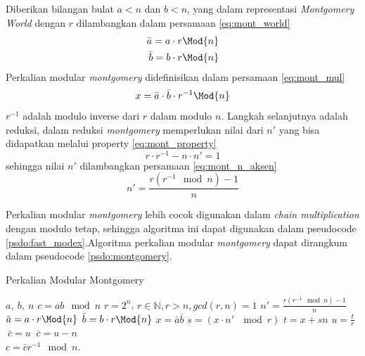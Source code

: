 Diberikan bilangan bulat $ a < n $ dan $ b < n $, yang dalam representasi \textit{Montgomery World} dengan $ r $ dilambangkan dalam persamaan \eqref{eq:mont_world}
\begin{equation}
	\begin{aligned}
		\bar{a} = a \cdot r \Mod{n} \\
		\bar{b} = b \cdot r \Mod{n} \\
	\end{aligned}
	\label{eq:mont_world}
\end{equation}
Perkalian modular \textit{montgomery} didefinisikan dalam persamaan \eqref{eq:mont_mul}
\begin{equation}
	x = \bar{a} \cdot \bar{b} \cdot r^{-1} \Mod{n}
	\label{eq:mont_mul}
\end{equation}
$ r^{-1} $ adalah modulo inverse dari $ r $ dalam modulo $ n $. Langkah selanjutnya adalah reduksi, dalam reduksi \textit{montgomery} memperlukan nilai dari $ n' $ yang bisa didapatkan melalui property \eqref{eq:mont_property}
\begin{equation}
	r \cdot r^{-1} - n \cdot n' = 1
	\label{eq:mont_property}
\end{equation}
sehingga nilai $ n' $ dilambangkan persamaan \eqref{eq:mont_n_aksen}
\begin{equation}
	n' = \frac{r(r^{-1}\mod{n}) -1}{n}
	\label{eq:mont_n_aksen}
\end{equation}

Perkalian modular \textit{montgomery} lebih cocok digunakan dalam \textit{chain multiplication} dengan modulo tetap, sehingga algoritma ini dapat digunakan dalam pseudocode \ref{psdo:fast_modex}.Algoritma perkalian modular \textit{montgomery} dapat dirangkum dalam pseudocode \ref{psdo:montgomery}. 

\begin{algorithm}
	\caption{Perkalian Modular Montgomery}
	\label{psdo:montgomery}
	\begin{algorithmic}[1]
		\Require $a,\ b,\ n$
		\Ensure $c = ab\mod{n}$
		\State $r = 2^n $, $ r \in \mathbb{N}, r > n, gcd(r,n) = 1 $
		\State $n' = \frac{r(r^{-1}\mod{n}) -1}{n} $
		\State $\bar{a} = a \cdot r \Mod{n} $
		\State $\bar{b} = b \cdot r \Mod{n} $
		\State $x = \bar{a}\bar{b} $
		\State $s = (x \cdot n'\ \mod{r}) $
		\State $t = x + sn $
		\State $u = \frac{t}{r} $
			$\ \bar{c} = u $
		\Else
			$\ \bar{c} = u - n $
		\EndIf \\
		\Return $ c = \bar{c}r^{-1}\mod{n} $.
	\end{algorithmic}
\end{algorithm}

